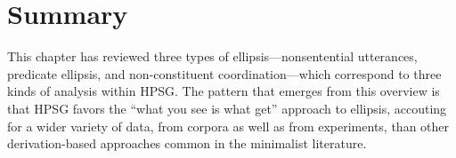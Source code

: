 %
%
%
%
%

%
%
%
%
%
%
%
%
%
%
%
%
%





\section{Summary}
\label{sum}
This chapter has reviewed three types of ellipsis---nonsentential utterances, predicate ellipsis, and non-constituent coordination---which correspond to three kinds of analysis within HPSG. The pattern that emerges from this overview is that HPSG favors the ``what you see is what get'' approach to ellipsis,
 accouting for a wider variety of data,  from corpora 
 as well as from experiments,  than other derivation-based approaches common in the minimalist literature.











